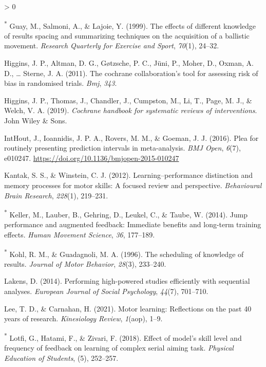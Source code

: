 \documentclass[
  english,
  man, donotrepeattitle,mask,floatsintext]{apa7}
\newlength{\cslhangindent}
\newenvironment{CSLReferences}[2] %
 {%
  \setlength{\parindent}{0pt}
  \ifodd #1 \everypar{\setlength{\hangindent}{\cslhangindent}}\ignorespaces\fi
  \ifnum #2 > 0
  \setlength{\parskip}{#2\baselineskip}
  \fi
 }%
 {}
\begin{document}
\begin{CSLReferences}{1}{0}
\leavevmode\hypertarget{ref-Guay1999}{}%
\textsuperscript{*} Guay, M., Salmoni, A., \& Lajoie, Y. (1999). The effects of different knowledge of results spacing and summarizing techniques on the acquisition of a ballistic movement. \emph{Research Quarterly for Exercise and Sport}, \emph{70}(1), 24--32.

\leavevmode\hypertarget{ref-Higgins2011}{}%
Higgins, J. P., Altman, D. G., Gøtzsche, P. C., Jüni, P., Moher, D., Oxman, A. D., \ldots{} Sterne, J. A. (2011). The cochrane collaboration's tool for assessing risk of bias in randomised trials. \emph{Bmj}, \emph{343}.

\leavevmode\hypertarget{ref-Higgins2019}{}%
Higgins, J. P., Thomas, J., Chandler, J., Cumpston, M., Li, T., Page, M. J., \& Welch, V. A. (2019). \emph{Cochrane handbook for systematic reviews of interventions}. John Wiley \& Sons.

\leavevmode\hypertarget{ref-IntHout2016}{}%
IntHout, J., Ioannidis, J. P. A., Rovers, M. M., \& Goeman, J. J. (2016). Plea for routinely presenting prediction intervals in meta-analysis. \emph{BMJ Open}, \emph{6}(7), e010247. \url{https://doi.org/10.1136/bmjopen-2015-010247}

\leavevmode\hypertarget{ref-Kantak2012}{}%
Kantak, S. S., \& Winstein, C. J. (2012). Learning--performance distinction and memory processes for motor skills: A focused review and perspective. \emph{Behavioural Brain Research}, \emph{228}(1), 219--231.

\leavevmode\hypertarget{ref-Keller2014}{}%
\textsuperscript{*} Keller, M., Lauber, B., Gehring, D., Leukel, C., \& Taube, W. (2014). Jump performance and augmented feedback: Immediate benefits and long-term training effects. \emph{Human Movement Science}, \emph{36}, 177--189.

\leavevmode\hypertarget{ref-Kohl1996}{}%
\textsuperscript{*} Kohl, R. M., \& Guadagnoli, M. A. (1996). The scheduling of knowledge of results. \emph{Journal of Motor Behavior}, \emph{28}(3), 233--240.

\leavevmode\hypertarget{ref-Lakens2014}{}%
Lakens, D. (2014). Performing high-powered studies efficiently with sequential analyses. \emph{European Journal of Social Psychology}, \emph{44}(7), 701--710.

\leavevmode\hypertarget{ref-Lee2021}{}%
Lee, T. D., \& Carnahan, H. (2021). Motor learning: Reflections on the past 40 years of research. \emph{Kinesiology Review}, \emph{1}(aop), 1--9.

\leavevmode\hypertarget{ref-Lotfi2018}{}%
\textsuperscript{*} Lotfi, G., Hatami, F., \& Zivari, F. (2018). Effect of model's skill level and frequency of feedback on learning of complex serial aiming task. \emph{Physical Education of Students}, (5), 252--257.


\end{CSLReferences}
\end{document}
